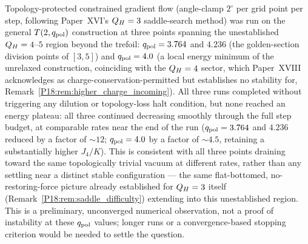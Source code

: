 \begin{remark}[Preliminary numerics beyond $\QH=3$: no distinct equilibrium found]
\label{P19:rem:beyond_qh3_numerics}
Topology-protected constrained gradient flow (angle-clamp $2^\circ$
per grid point per step, following Paper~XVI's $\QH=3$ saddle-search
method) was run on the general $T(2,q_{\rm pol})$ construction at
three points spanning the unestablished $Q_H=4$--$5$ region beyond
the trefoil: $q_{\rm pol}=3.764$ and $4.236$ (the golden-section
division points of $[3,5]$) and $q_{\rm pol}=4.0$ (a local energy
minimum of the unrelaxed construction, coinciding with the $Q_H=4$
sector, which Paper~XVIII acknowledges as charge-conservation-permitted
but establishes no stability for, Remark~\ref{P18:rem:higher_charge_incoming}).
All three runs completed without triggering any dilution or
topology-loss halt condition, but none reached an energy plateau: all
three continued decreasing smoothly through the full step budget, at
comparable rates near the end of the run ($q_{\rm pol}=3.764$ and
$4.236$ reduced by a factor of $\sim12$; $q_{\rm pol}=4.0$ by a
factor of $\sim4.5$, retaining a substantially higher $J_4/K$). This
is consistent with all three points draining toward the same
topologically trivial vacuum at different rates, rather than any
settling near a distinct stable configuration --- the same
flat-bottomed, no-restoring-force picture already established for
$\QH=3$ itself (Remark~\ref{P18:rem:saddle_difficulty}) extending
into this unestablished region. This is a preliminary, unconverged
numerical observation, not a proof of instability at these
$q_{\rm pol}$ values; longer runs or a convergence-based stopping
criterion would be needed to settle the question.
\end{remark}
